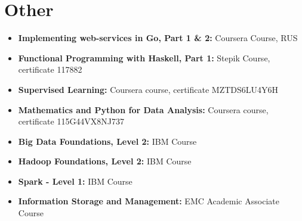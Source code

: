 \documentclass[letterpaper,10pt]{article}
\newcommand{\resumeItem}[2]{
  \item\small{
    \textbf{#1:}{ #2 \vspace{-2pt}}
  }
}
\newcommand{\resumeSubItem}[2]{\vspace{-0pt}\resumeItem{#1}{#2}\vspace{-0pt}}
\newcommand{\resumeSubHeadingListStart}{\begin{itemize}[leftmargin=*]}
\newcommand{\resumeSubHeadingListEnd}{\end{itemize}}
\begin{document}
\begin{minipage}[t]{0.33\textwidth}
\section{Other}
  \resumeSubHeadingListStart
    \resumeSubItem{Implementing web-services in Go, Part 1 \& 2}
      {Coursera Course, RUS}
    \resumeSubItem{Functional Programming with Haskell, Part 1}
      {Stepik Course, certificate 117882}
    \resumeSubItem{Supervised Learning}
      {Coursera course, certificate MZTDS6LU4Y6H}
    \resumeSubItem{Mathematics and Python for Data Analysis}
      {Coursera course, certificate 115G44VX8NJ737}
     \item\small{
    \textbf{Big Data Foundations, Level 2: }{IBM Course\vspace{-2pt}}}
    \resumeSubItem {Hadoop Foundations, Level 2}
      {IBM Course}
    \resumeSubItem{Spark - Level 1}
      {IBM Course}
    \resumeSubItem {Information Storage and Management}
      {EMC Academic Associate Course}
  \resumeSubHeadingListEnd




\end{minipage}
\end{document}

